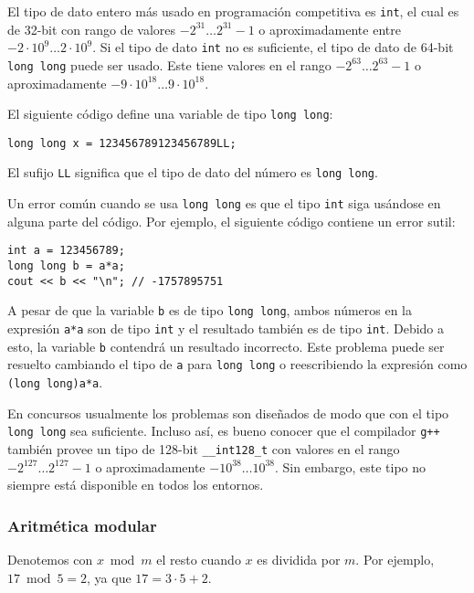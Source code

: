 El tipo de dato entero m\'as usado en programaci\'on
competitiva es \texttt{int}, el cual es de
32-bit con rango de valores $-2^{31} \ldots 2^{31}-1$
o aproximadamente entre $-2 \cdot 10^9 \ldots 2 \cdot 10^9$.
Si el tipo de dato \texttt{int} no es suficiente,
el tipo de dato de 64-bit \texttt{long long} puede ser
usado. Este tiene valores en el rango $-2^{63} \ldots 2^{63}-1$
o aproximadamente $-9 \cdot 10^{18} \ldots 9 \cdot 10^{18}$.

El siguiente c\'odigo define una variable de tipo
\texttt{long long}:

\begin{lstlisting}
long long x = 123456789123456789LL;
\end{lstlisting}

El sufijo \texttt{LL} significa que el tipo de dato
del n\'umero es \texttt{long long}.

Un error com\'un cuando se usa \texttt{long long}
es que el tipo \texttt{int} siga us\'andose
en alguna parte del c\'odigo.
Por ejemplo, el siguiente c\'odigo contiene un error
sutil:

\begin{lstlisting}
int a = 123456789;
long long b = a*a;
cout << b << "\n"; // -1757895751
\end{lstlisting}

A pesar de que la variable \texttt{b} es de tipo
\texttt{long long}, ambos n\'umeros en la expresi\'on
\texttt{a*a} son de tipo \texttt{int} y el resultado
tambi\'en es de tipo \texttt{int}.
Debido a esto, la variable \texttt{b} contendr\'a
un resultado incorrecto. Este problema puede ser
resuelto cambiando el tipo de \texttt{a}
para \texttt{long long}
o reescribiendo la expresi\'on como \texttt{(long long)a*a}.

En concursos usualmente los problemas
son dise\~nados de modo que con el tipo
\texttt{long long} sea suficiente.
Incluso as\'i, es bueno conocer que el compilador
\texttt{g++} tambi\'en provee
un tipo de 128-bit \texttt{\_\_int128\_t}
con valores en el rango
$-2^{127} \ldots 2^{127}-1$ o aproximadamente
$-10^{38} \ldots 10^{38}$.
Sin embargo, este tipo no siempre est\'a disponible
en todos los entornos.

\subsubsection{Aritm\'etica modular}


Denotemos con $x \bmod m$ el resto cuando
$x$ es dividida por $m$.
Por ejemplo, $17 \bmod 5 = 2$,
ya que $17 = 3 \cdot 5 + 2$.

